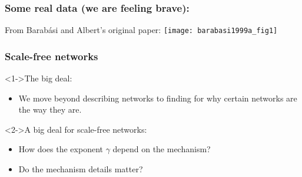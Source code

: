 \begin{frame}[label=]
 \frametitle{Some real data (we are feeling brave):}

 \begin{block}{From Barab\'{a}si and Albert's original paper\cite{barabasi1999a}:}
   \texttt{[image: barabasi1999a\_fig1]}   
 \end{block}
 
\end{frame}



\begin{frame}[label=]
 \frametitle{Scale-free networks}

 \begin{block}<1->{The big deal:}
   \begin{itemize}
   \item<1->
     We move beyond describing networks
     to finding  for why
     certain networks are the way they are.
   \end{itemize}
 \end{block}

 \begin{block}<2->{A big deal for scale-free networks:}
   \begin{itemize}
   \item<2->
     How does the exponent $\gamma$ depend on the mechanism?
   \item<3->
     Do the mechanism details matter?
   \end{itemize}
 \end{block}
 
\end{frame}





